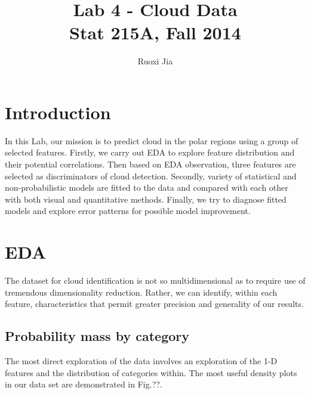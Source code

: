 \documentclass[english]{article}\usepackage{graphicx, color}
\numberwithin{equation}{section}
\numberwithin{figure}{section}
\begin{document}
\title{Lab 4 - Cloud Data\\
Stat 215A, Fall 2014}


\author{Ruoxi Jia}

\maketitle
\section{Introduction}
In this Lab, our mission is to predict cloud in the polar regions using a group of selected features. Firstly, we carry out EDA to explore feature distribution and their potential correlations. Then based on EDA observation, three features are selected as discriminators of cloud detection. Secondly, variety of  statistical and non-probabilistic models are fitted to the data and compared with each other with both visual and quantitative methods. Finally, we try to diagnose fitted models and explore error patterns for possible model improvement.

\section{EDA}
The dataset for cloud identification is not so multidimensional as to require use of tremendous dimensionality reduction. Rather, we can identify, within each feature, characteristics that permit greater precision and generality of our results.

\subsection{Probability mass by category}
The most direct exploration of the data involves an exploration of the 1-D 
features and the distribution of categories within. The most useful density 
plots in our data set are demonstrated in Fig.??. 
\end{document}
